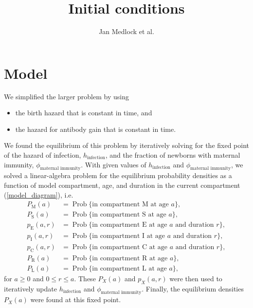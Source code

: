 \documentclass[12pt]{article}
\title{Initial conditions}
\author{Jan Medlock et al.}
\DeclareMathOperator{\Prob}{Prob}
\begin{document}
\maketitle

\section{Model}

We simplified the larger problem by using
\begin{itemize}
\item the birth hazard that is constant in time, and
\item the hazard for antibody gain that is constant in time.
\end{itemize}
We found the equilibrium of this problem by iteratively solving for
the fixed point of the hazard of infection, $h_{\text{infection}}$,
and the fraction of newborns with maternal immunity,
$\phi_{\text{maternal immunity}}$. With given values of
$h_{\text{infection}}$ and $\phi_{\text{maternal immunity}}$, we
solved a linear-algebra problem for the equilibrium
probability densities as a function of model compartment, age, and
duration in the current compartment
(\autoref{model_diagram}), i.e.
\begin{subequations}
  \begin{align}
    P_{\mathrm{M}}(a)
    &= \Prob\{\text{in compartment $\mathrm{M}$ at age $a$}\},\\
    P_{\mathrm{S}}(a)
    &= \Prob\{\text{in compartment $\mathrm{S}$ at age $a$}\},\\
    p_{\mathrm{E}}(a, r)
    &= \Prob\{\text{in compartment $\mathrm{E}$ at age $a$ and
      duration $r$}\},\\
    p_{\mathrm{I}}(a, r)
    &= \Prob\{\text{in compartment $\mathrm{I}$ at age $a$ and
      duration $r$}\},\\
    p_{\mathrm{C}}(a, r)
    &= \Prob\{\text{in compartment $\mathrm{C}$ at age $a$ and
      duration $r$}\},\\
    P_{\mathrm{R}}(a)
    &= \Prob\{\text{in compartment $\mathrm{R}$ at age $a$}\},\\
    P_{\mathrm{L}}(a)
    &= \Prob\{\text{in compartment $\mathrm{L}$ at age $a$}\},
  \end{align}
\end{subequations}
for $a \geq 0$ and $0 \leq r \leq a$.
These $P_X(a)$ and $p_X(a, r)$ were then used to iteratively update
$h_{\text{infection}}$ and $\phi_{\text{maternal immunity}}$. Finally,
the equilibrium densities $P_X(a)$ were found at this fixed point.
\end{document}
